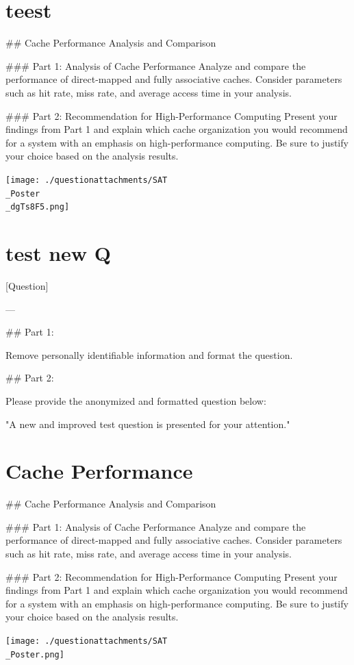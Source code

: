 \documentclass{article}%
\begin{document}
%
\section{\textbf{teest}}%
\label{sec:textbfteest}%
## Cache Performance Analysis and Comparison

### Part 1: Analysis of Cache Performance
Analyze and compare the performance of direct-mapped and fully associative caches. Consider parameters such as hit rate, miss rate, and average access time in your analysis. 

### Part 2: Recommendation for High-Performance Computing
Present your findings from Part 1 and explain which cache organization you would recommend for a system with an emphasis on high-performance computing. Be sure to justify your choice based on the analysis results.%
\begin{center}%
\texttt{[image: ./questionattachments/SAT\\\_Poster\\\_dgTs8F5.png]}%
\end{center}

%
\section{\textbf{test new Q}}%
\label{sec:textbftestnewQ}%
[Question]

---

## Part 1: 

Remove personally identifiable information and format the question. 

## Part 2: 

Please provide the anonymized and formatted question below: 

"A new and improved test question is presented for your attention."

%
\section{\textbf{Cache Performance}}%
\label{sec:textbfCachePerformance}%
## Cache Performance Analysis and Comparison

### Part 1: Analysis of Cache Performance
Analyze and compare the performance of direct-mapped and fully associative caches. Consider parameters such as hit rate, miss rate, and average access time in your analysis. 

### Part 2: Recommendation for High-Performance Computing
Present your findings from Part 1 and explain which cache organization you would recommend for a system with an emphasis on high-performance computing. Be sure to justify your choice based on the analysis results.%
\begin{center}%
\texttt{[image: ./questionattachments/SAT\\\_Poster.png]}%
\end{center}
\end{document}
